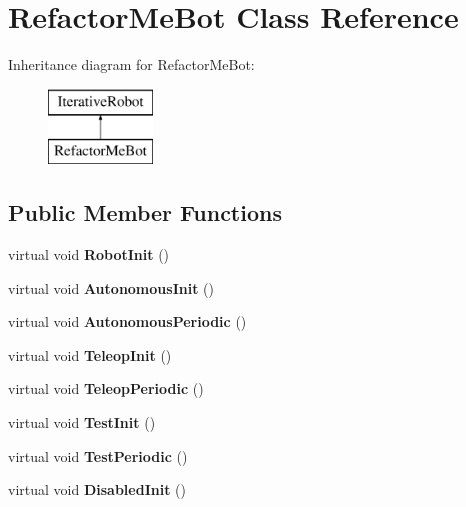 \hypertarget{class_refactor_me_bot}{}\section{Refactor\+Me\+Bot Class Reference}
\label{class_refactor_me_bot}
Inheritance diagram for Refactor\+Me\+Bot\+:\begin{figure}[H]
\begin{center}
\leavevmode
\includegraphics[height=2.000000cm]{class_refactor_me_bot}
\end{center}
\end{figure}
\subsection*{Public Member Functions}
\begin{DoxyCompactItemize}
\item 
\hypertarget{class_refactor_me_bot_a4464852183942a043f51a948c7825aca}{}virtual void {\bfseries Robot\+Init} ()\label{class_refactor_me_bot_a4464852183942a043f51a948c7825aca}

\item 
\hypertarget{class_refactor_me_bot_aae7bfcc0040e8dcc0fed004cad697342}{}virtual void {\bfseries Autonomous\+Init} ()\label{class_refactor_me_bot_aae7bfcc0040e8dcc0fed004cad697342}

\item 
\hypertarget{class_refactor_me_bot_a8522e96f7ae0e3e44b0edaee73f4663f}{}virtual void {\bfseries Autonomous\+Periodic} ()\label{class_refactor_me_bot_a8522e96f7ae0e3e44b0edaee73f4663f}

\item 
\hypertarget{class_refactor_me_bot_a649cc8d188963e053af407db8d2da2c1}{}virtual void {\bfseries Teleop\+Init} ()\label{class_refactor_me_bot_a649cc8d188963e053af407db8d2da2c1}

\item 
\hypertarget{class_refactor_me_bot_a1d5773b16f342a18eb48bfd0c59a5a18}{}virtual void {\bfseries Teleop\+Periodic} ()\label{class_refactor_me_bot_a1d5773b16f342a18eb48bfd0c59a5a18}

\item 
\hypertarget{class_refactor_me_bot_a2d6d5159796b429a5b4d45a9467f7052}{}virtual void {\bfseries Test\+Init} ()\label{class_refactor_me_bot_a2d6d5159796b429a5b4d45a9467f7052}

\item 
\hypertarget{class_refactor_me_bot_af206ce7910d550e6adbb6bcfe1e6066a}{}virtual void {\bfseries Test\+Periodic} ()\label{class_refactor_me_bot_af206ce7910d550e6adbb6bcfe1e6066a}

\item 
\hypertarget{class_refactor_me_bot_ad3488209a322d14cb77916795ea419f6}{}virtual void {\bfseries Disabled\+Init} ()\label{class_refactor_me_bot_ad3488209a322d14cb77916795ea419f6}

\end{DoxyCompactItemize}


